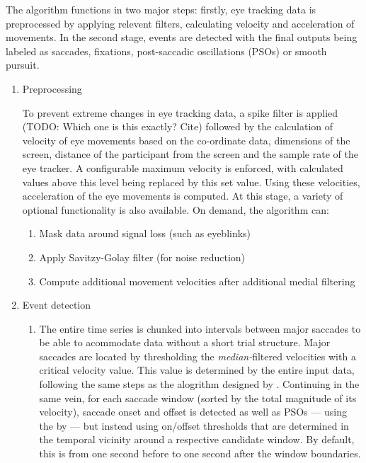 \documentclass[10pt,a4paper]{extarticle}
\begin{document}
The algorithm functions in two major steps: firstly, eye tracking data is preprocessed by applying relevent filters, calculating velocity and acceleration of movements. In the second stage, events are detected with the final outputs being labeled as saccades, fixations, post-saccadic oscillations (PSOs) or smooth pursuit.
\begin{enumerate}
\item{Preprocessing}

 To prevent extreme changes in eye tracking data, a spike filter is applied (TODO: Which one is this exactly? Cite) followed by the calculation of velocity of eye movements based on the co-ordinate data,  dimensions of the screen, distance of the participant from the screen and the sample rate of the eye tracker. A configurable maximum velocity is enforced, with calculated values above this level being replaced by this set value. Using these velocities, acceleration of the eye movements is computed. 
 At this stage, a variety of optional functionality is also available. On demand, the algorithm can: 
 \begin{enumerate}
 	\item Mask data around signal loss (such as eyeblinks)
 	\item Apply Savitzy-Golay filter (for noise reduction) 
 	\item Compute additional movement velocities after additional medial filtering
 	
 \end{enumerate}

\item{Event detection}
\begin{enumerate}

 \item The entire time series is chunked into intervals between major saccades to be able to acommodate data without a short trial structure. Major saccades are located by thresholding the \textit{median-}filtered velocities with a critical velocity value. This value is determined by the entire input data, following the same steps as the alogrithm designed by \citet{Nystrom2010AnData}. Continuing in the same vein, for each saccade window (sorted by the total magnitude of its velocity), saccade onset and offset is detected as well as PSOs --- using the by \citet{Nystrom2010AnData} --- but instead using on/offset thresholds that are determined in the temporal vicinity around a respective candidate window. By default, this  is from one second before to one second after the window boundaries.
 

\end{enumerate}
\end{enumerate}
\end{document}
